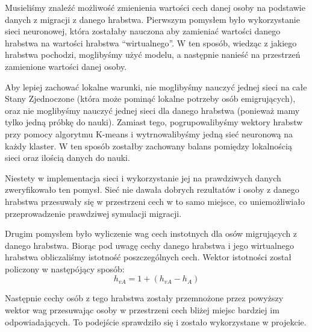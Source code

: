 \documentclass[a4paper,12pt]{article}
\begin{document}
Musieliśmy znaleźć możliwość zmienienia wartości cech danej osoby na podstawie danych z migracji z danego hrabstwa. Pierwszym pomysłem było wykorzystanie sieci neuronowej, która zostałaby nauczona aby zamieniać wartości danego hrabstwa na wartości hrabstwa ``wirtualnego''. W ten sposób, wiedząc z jakiego hrabstwa pochodzi, moglibyśmy użyć modelu, a następnie nanieść na przestrzeń zamienione wartości danej osoby. 

Aby lepiej zachować lokalne warunki, nie moglibyśmy nauczyć jednej sieci na całe Stany Zjednoczone (która może pominąć lokalne potrzeby osób emigrujących), oraz nie moglibyśmy nauczyć jednej sieci dla danego hrabstwa (ponieważ mamy tylko jedną próbkę do nauki). Zamiast tego, pogrupowalibyśmy wektory hrabstw przy pomocy algorytmu K-means i wytrnowalibyśmy jedną sieć neuronową na każdy klaster. W ten sposób zostałby zachowany balans pomiędzy lokalnością sieci oraz ilością danych do nauki.

Niestety w implementacja sieci i wykorzystanie jej na prawdziwych danych zweryfikowało ten pomysł. Sieć nie dawała dobrych rezultatów i osoby z danego hrabstwa przesuwały się w przestrzeni cech w to samo miejsce, co uniemożliwiało przeprowadzenie prawdziwej symulacji migracji.

Drugim pomysłem było wyliczenie wag cech instotnych dla osów migrujących z danego hrabstwa. Biorąc pod uwagę cechy danego hrabstwa i jego wirtualnego hrabstwa obliczaliśmy istotność poszczególnych cech. 
Wektor istotności został policzony w następójący sposób:
\begin{equation}
    h_{vA} = 1 + (h_{vA} - h_{A})
\end{equation}

Następnie cechy osób z tego hrabstwa zostały przemnożone przez powyższy wektor wag przesuwając osoby w przestrzeni cech bliżej miejsc bardziej im odpowiadających. To podejście sprawdziło się i zostało wykorzystane w projekcie.
\end{document}
